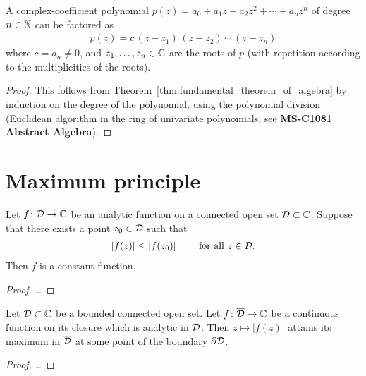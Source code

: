 \begin{corollary}
  \label{cor:complex_polynomial_factorization}
  A complex-coefficient
  polynomial $p(z) = a_0 + a_1 z + a_2 z^2 + \cdots + a_n z^n$
  of degree $n \in \mathbb{N}$ can be factored as
  \begin{align*}
    p(z) = c \, (z - z_1) \, (z - z_2) \, \cdots \, (z - z_n)
  \end{align*}
  where $c = a_n \ne 0$, and $z_1 , \ldots, z_n \in \mathbb{C}$
  are the roots of $p$ (with repetition according to the
  multiplicities of the roots).
\end{corollary}
\begin{proof}
  This follows from Theorem~\ref{thm:fundamental_theorem_of_algebra}
  by induction on the degree of the polynomial,
  using the polynomial division (Euclidean algorithm in the
  ring of univariate polynomials, see \textbf{MS-C1081 Abstract Algebra}).
\end{proof}



\section{Maximum principle}

\begin{theorem}
  \label{thm:maximum_principle}
  Let $f \colon \mathcal{D} \to \mathbb{C}$ be an analytic function on a
  connected open set $\mathcal{D} \subset \mathbb{C}$.
  Suppose that there exists a point $z_0 \in \mathcal{D}$
  such that
  \begin{align*}
    |f(z)| \le |f(z_0)| \qquad \text{ for all } z \in \mathcal{D} .
  \end{align*}
  Then $f$ is a constant function.
\end{theorem}
\begin{proof}
  \ldots
\end{proof}

\begin{corollary}
  \label{cor:maximum_modulus_on_boundary}
  Let $\mathcal{D} \subset \mathbb{C}$ be a bounded connected open set.
  Let $f \colon \overline{{\mathcal{D}}} \to \mathbb{C}$ be a continuous function
  on its closure which is analytic in $\mathcal{D}$.
  Then $z \mapsto |f(z)|$ attains its maximum in $\overline{{\mathcal{D}}}$
  at some point of the boundary $\partial \mathcal{D}$.
\end{corollary}
\begin{proof}
  \ldots
\end{proof}

